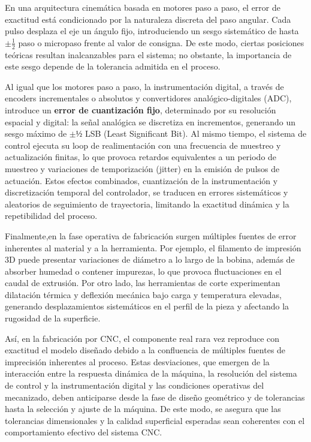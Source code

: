 En una arquitectura cinemática basada en motores paso a paso, el error de exactitud está condicionado por la naturaleza discreta del paso angular. Cada pulso desplaza el eje un ángulo fijo, introduciendo un sesgo sistemático de hasta $\pm \tfrac{1}{2}$ paso o micropaso frente al valor de consigna. De este modo, ciertas posiciones teóricas resultan inalcanzables para el sistema; no obstante, la importancia de este sesgo depende de la tolerancia admitida en el proceso.

Al igual que los motores paso a paso, la instrumentación digital, a través de encoders incrementales o absolutos y convertidores analógico-digitales (ADC), introduce un \textbf{error de cuantización fijo}, determinado por su resolución espacial y digital: la señal analógica se discretiza en incrementos, generando un sesgo máximo de $\pm ½$ LSB (Least Significant Bit). Al mismo tiempo, el sistema de control ejecuta su loop de realimentación con una frecuencia de muestreo y actualización finitas, lo que provoca retardos equivalentes a un periodo de muestreo y variaciones de temporización (jitter) en la emisión de pulsos de actuación. Estos efectos combinados, cuantización de la instrumentación y discretización temporal del controlador, se traducen en errores sistemáticos y aleatorios de seguimiento de trayectoria, limitando la exactitud dinámica y la repetibilidad del proceso.

Finalmente,en la fase operativa de fabricación surgen múltiples fuentes de error inherentes al material y a la herramienta. Por ejemplo, el filamento de impresión 3D puede presentar variaciones de diámetro a lo largo de la bobina, además de absorber humedad o contener impurezas, lo que provoca fluctuaciones en el caudal de extrusión. Por otro lado, las herramientas de corte experimentan dilatación térmica y deflexión mecánica bajo carga y temperatura elevadas, generando desplazamientos sistemáticos en el perfil de la pieza y afectando la rugosidad de la superficie.

Así, en la fabricación por CNC, el componente real rara vez reproduce con exactitud el modelo diseñado debido a la confluencia de múltiples fuentes de imprecisión inherentes al proceso. Estas desviaciones, que emergen de la interacción entre la respuesta dinámica de la máquina, la resolución del sistema de control y la instrumentación digital y las condiciones operativas del mecanizado, deben anticiparse desde la fase de diseño geométrico y de tolerancias hasta la selección y ajuste de la máquina. De este modo, se asegura que las tolerancias dimensionales y la calidad superficial esperadas sean coherentes con el comportamiento efectivo del sistema CNC.

